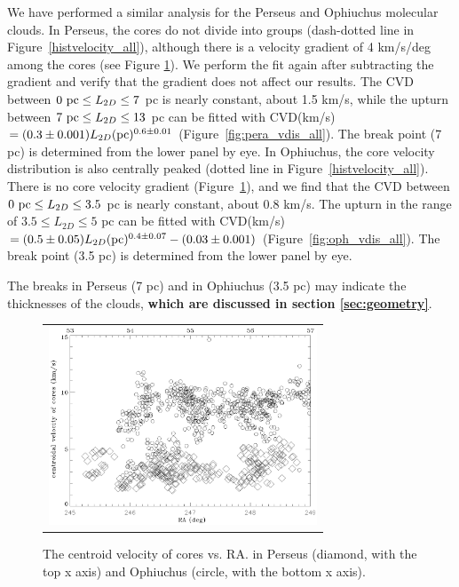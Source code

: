 \documentclass[iop,revtex4]{emulateapj}
\begin{document}
We have performed a similar analysis for the Perseus and Ophiuchus molecular clouds. In Perseus, the cores do not divide into groups (dash-dotted line in Figure~\ref{histvelocity_all}), although there is a velocity gradient of 4 km/s/deg among the cores (see Figure \ref{fig:perseus_core_gradient}). We perform the fit again after subtracting the gradient and verify that the gradient does not affect our results. The CVD between $0\ {\rm pc}\leq L_{2D} \leq 7$ pc is nearly constant, about 1.5 km/s, while the upturn between $7\ {\rm pc}\leq L_{2D} \leq 13$ pc can be fitted with CVD(km/s)$=(0.3\pm 0.001)L_{2D} ({\rm pc})^{0.6\pm 0.01}$ (Figure~\ref{fig:pera_vdis_all}). The break point (7 pc) is determined from the lower panel by eye. In Ophiuchus, the core velocity distribution is also centrally peaked (dotted line in Figure~\ref{histvelocity_all}). There is no core velocity gradient (Figure~\ref{fig:perseus_core_gradient}), and we find that the  CVD between $0\ {\rm pc}\leq L_{2D} \leq 3.5$ pc is nearly constant, about 0.8 km/s. The upturn in the range of $3.5\leq L_{2D} \leq 5$  pc can be fitted with CVD(km/s)$=(0.5\pm 0.05)L_{2D} ({\rm pc})^{0.4\pm 0.07}-(0.03\pm 0.001)$ (Figure~\ref{fig:oph_vdis_all}). The break point (3.5 pc) is determined from the lower panel by eye.

The breaks in Perseus (7 pc) and in Ophiuchus (3.5 pc) may indicate the thicknesses of the clouds, {\bf which are discussed in section \ref{sec:geometry}}.








\begin{figure}[htbp]
\centering
\begin{tabular}{c}
\includegraphics[width=8cm]{pera_oph_velocityra.eps}
\end{tabular}
\caption{The centroid velocity of cores vs. RA. in Perseus (diamond, with the top x axis) and Ophiuchus (circle, with the bottom x axis).}\label{fig:perseus_core_gradient}
\end{figure}
\end{document}
